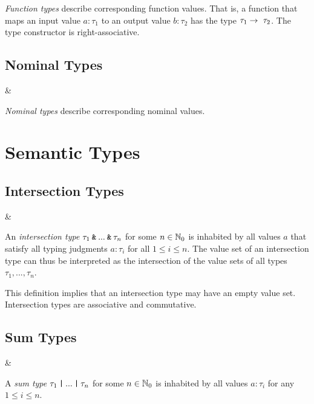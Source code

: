 \noindent \textit{Function types} describe corresponding function values. That is, a function that maps an input value $a : \tau_1$ to an output value $b : \tau_2$ has the type $\tau_1 \fto \tau_2$. The type constructor is right-associative.


\subsection{Nominal Types}

\begin{grammar}
 &\produce {}
\end{grammar}

\noindent \textit{Nominal types} describe corresponding nominal values.



\section{Semantic Types}

\subsection{Intersection Types}

\begin{grammar}
 &\produce {}
\end{grammar}

\noindent An \textit{intersection type} $\tau_1 \mathbin{\texttt{\&}} ... \mathbin{\texttt{\&}} \tau_n$ for some $n \in \mathbb{N}_0$ is inhabited by all values $a$ that satisfy all typing judgments $a : \tau_i$ for all $1 \leq i \leq n$. The value set of an intersection type can thus be interpreted as the intersection of the value sets of all types $\tau_1, ..., \tau_n$.

This definition implies that an intersection type may have an empty value set. Intersection types are associative and commutative.


\subsection{Sum Types}

\begin{grammar}
 &\produce {}
\end{grammar}

\noindent A \textit{sum type} $\tau_1 \mathbin{\texttt{|}} ... \mathbin{\texttt{|}} \tau_n$ for some $n \in \mathbb{N}_0$ is inhabited by all values $a : \tau_i$ for any $1 \leq i \leq n$. 

